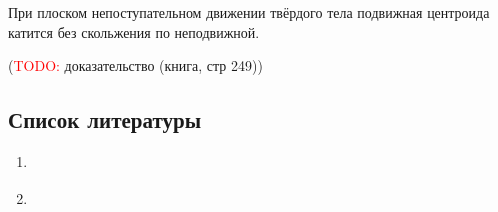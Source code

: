 \begin{theorem}[Пуансо]
  При плоском непоступательном движении твёрдого тела подвижная центроида
  катится без скольжения по неподвижной.
\end{theorem}

(\textcolor{red}{TODO:} доказательство (книга, стр 249))

\subsection{Список литературы}
\begin{enumerate}
  \item \cite{lectures}
  \item \cite{lourie}
\end{enumerate}

